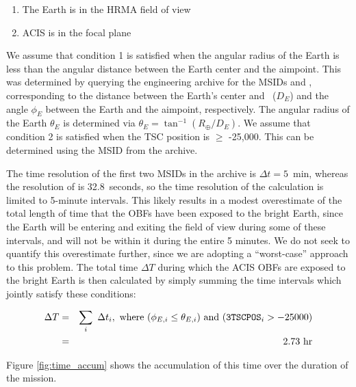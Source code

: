 \documentclass[11pt]{article}
\begin{document}
\begin{enumerate}
\item The Earth is in the HRMA field of view
\item ACIS is in the focal plane
\end{enumerate}

We assume that condition 1 is satisfied when the angular radius of the Earth is less than the
angular distance between the Earth center and the aimpoint. This was determined by querying
the  engineering archive for the MSIDs  and ,
corresponding to the distance between the Earth's center and \chandra~($D_E$) and the angle $\phi_E$ between
the Earth and the aimpoint, respectively. The angular radius of the Earth $\theta_E$ is determined
via $\theta_E = \tan^{-1} (R_\oplus/D_E)$. We assume that condition 2 is satisfied when the TSC
position is $\geq$ -25,000. This can be determined using the MSID  from the 
archive.

The time resolution of the first two MSIDs in the archive is $\Delta{t} = 5$~min, whereas the resolution
of  is 32.8~seconds, so the time resolution of the calculation is limited to 5-minute intervals.
This likely results in a modest overestimate of the total length of time that the OBFs have been exposed to
the bright Earth, since the Earth will be entering and exiting the field of view during some of these intervals,
and will not be within it during the entire 5 minutes. We do not seek to quantify this overestimate further,
since we are adopting a ``worst-case'' approach to this problem. The total time $\Delta{T}$ during which the ACIS
OBFs are exposed to the bright Earth is then calculated by simply summing the time intervals which jointly satisfy
these conditions:

\begin{eqnarray}
\Delta{T} &=& \displaystyle\sum_i~\Delta{t_i},~{\rm where}~(\phi_{E,i} \leq \theta_{E,i})~{\rm and}~(\texttt{3TSCPOS}_i > -25000) \\
\nonumber &=& 2.73~{\rm hr}
\end{eqnarray}

\noindent
Figure \ref{fig:time_accum} shows the accumulation of this time over the duration of the mission.
\end{document}
